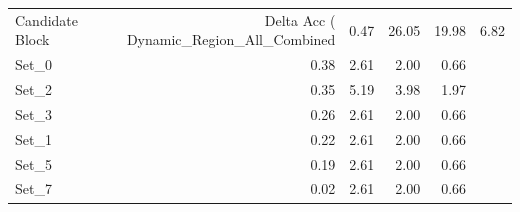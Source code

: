 \begin{tabular}{lrrrr}
\toprule
Candidate Block & Delta Acc (%
\midrule
Dynamic_Region_All_Combined & 0.47 & 26.05 & 19.98 & 6.82 \\
Set_0 & 0.38 & 2.61 & 2.00 & 0.66 \\
Set_2 & 0.35 & 5.19 & 3.98 & 1.97 \\
Set_3 & 0.26 & 2.61 & 2.00 & 0.66 \\
Set_1 & 0.22 & 2.61 & 2.00 & 0.66 \\
Set_5 & 0.19 & 2.61 & 2.00 & 0.66 \\
Set_7 & 0.02 & 2.61 & 2.00 & 0.66 \\
\bottomrule
\end{tabular}
